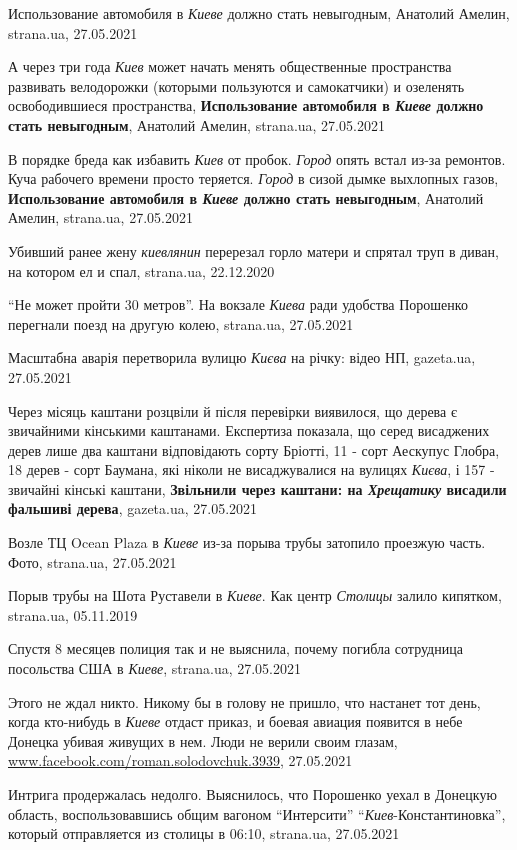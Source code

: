 Использование автомобиля в \emph{Киеве} должно стать невыгодным, Анатолий
Амелин, strana.ua, 27.05.2021

А через три года \emph{Киев} может начать менять общественные пространства
развивать велодорожки (которыми пользуются и самокатчики) и озеленять
освободившиеся пространства, \textbf{Использование автомобиля в \emph{Киеве}
должно стать невыгодным}, Анатолий Амелин, strana.ua, 27.05.2021

В порядке бреда как избавить \emph{Киев} от пробок.  \emph{Город} опять встал
из-за ремонтов. Куча рабочего времени просто теряется.  \emph{Город} в сизой
дымке выхлопных газов, \textbf{Использование автомобиля в \emph{Киеве} должно
стать невыгодным}, Анатолий Амелин, strana.ua, 27.05.2021

Убивший ранее жену \emph{киевлянин} перерезал горло матери и спрятал труп в
диван, на котором ел и спал, strana.ua, 22.12.2020

\enquote{Не может пройти 30 метров}. На вокзале \emph{Киева} ради удобства
Порошенко перегнали поезд на другую колею, strana.ua, 27.05.2021

Масштабна аварія перетворила вулицю \emph{Києва} на річку: відео НП, gazeta.ua,
27.05.2021

Через місяць каштани розцвіли й після перевірки виявилося, що дерева є
звичайними кінськими каштанами. Експертиза показала, що серед висаджених дерев
лише два каштани відповідають сорту Бріотті, 11 - сорт Аескупус Глобра, 18
дерев - сорт Баумана, які ніколи не висаджувалися на вулицях \emph{Києва}, і
157 - звичайні кінські каштани, \textbf{Звільнили через каштани: на \emph{Хрещатику}
висадили фальшиві дерева}, gazeta.ua, 27.05.2021

Возле ТЦ Ocean Plaza в \emph{Киеве} из-за порыва трубы затопило проезжую часть. Фото,
strana.ua, 27.05.2021

Порыв трубы на Шота Руставели в \emph{Киеве}. Как центр \emph{Столицы} залило
кипятком, strana.ua, 05.11.2019

Спустя 8 месяцев полиция так и не выяснила, почему погибла сотрудница
посольства США в \emph{Киеве}, strana.ua, 27.05.2021

Этого не ждал никто. Никому бы в голову не пришло, что настанет тот день, когда
кто-нибудь в \emph{Киеве} отдаст приказ, и боевая авиация появится в небе
Донецка убивая живущих в нем. Люди не верили своим глазам,
\url{www.facebook.com/roman.solodovchuk.3939}, 27.05.2021

Интрига продержалась недолго. Выяснилось, что Порошенко уехал в Донецкую
область,  воспользовавшись общим вагоном \enquote{Интерсити}
\enquote{\emph{Киев}-Константиновка}, который отправляется из столицы в 06:10,
strana.ua, 27.05.2021

